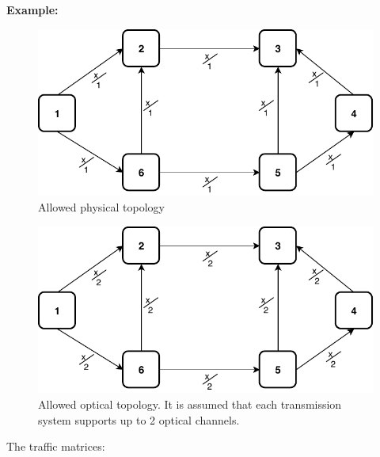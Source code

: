 \newpage
\vspace{11pt}

\textbf{Example:}

\begin{figure}[h!]
	\centering
	\includegraphics[width=13cm]{sdf/heuristic/opaque/figures/allowed_physical_ex}
	\caption{Allowed physical topology}
	\label{allowed_physical_ex}
\end{figure}


\begin{figure}[h!]
	\centering
	\includegraphics[width=13cm]{sdf/heuristic/opaque/figures/allowed_optical_ex}
	\caption{Allowed optical topology. It is assumed that each transmission system supports up to 2 optical channels.}
	\label{allowed_optical_ex}
\end{figure}

The traffic matrices:

